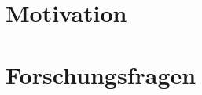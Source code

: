 
\section{Motivation}
\label{sec:intro-Motivation}



\section{Forschungsfragen}
\label{sec:intro-Forschungsfragen}


